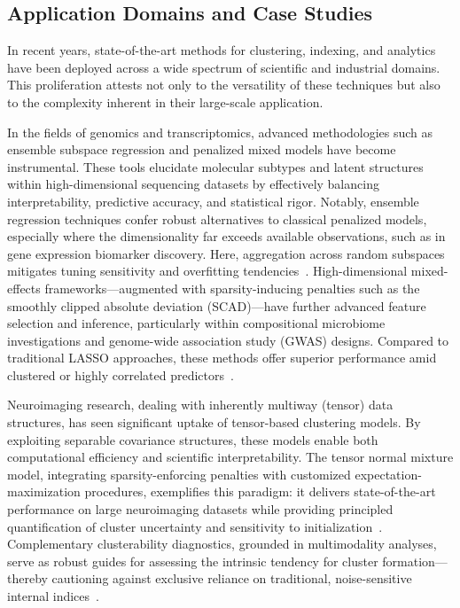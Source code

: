 \documentclass[sigconf]{acmart}
\begin{document}
\subsection{Application Domains and Case Studies}

In recent years, state-of-the-art methods for clustering, indexing, and analytics have been deployed across a wide spectrum of scientific and industrial domains. This proliferation attests not only to the versatility of these techniques but also to the complexity inherent in their large-scale application. 

In the fields of genomics and transcriptomics, advanced methodologies such as ensemble subspace regression and penalized mixed models have become instrumental. These tools elucidate molecular subtypes and latent structures within high-dimensional sequencing datasets by effectively balancing interpretability, predictive accuracy, and statistical rigor. Notably, ensemble regression techniques confer robust alternatives to classical penalized models, especially where the dimensionality far exceeds available observations, such as in gene expression biomarker discovery. Here, aggregation across random subspaces mitigates tuning sensitivity and overfitting tendencies~\cite{ref79,ref100}. High-dimensional mixed-effects frameworks—augmented with sparsity-inducing penalties such as the smoothly clipped absolute deviation (SCAD)—have further advanced feature selection and inference, particularly within compositional microbiome investigations and genome-wide association study (GWAS) designs. Compared to traditional LASSO approaches, these methods offer superior performance amid clustered or highly correlated predictors~\cite{ref82}.

Neuroimaging research, dealing with inherently multiway (tensor) data structures, has seen significant uptake of tensor-based clustering models. By exploiting separable covariance structures, these models enable both computational efficiency and scientific interpretability. The tensor normal mixture model, integrating sparsity-enforcing penalties with customized expectation-maximization procedures, exemplifies this paradigm: it delivers state-of-the-art performance on large neuroimaging datasets while providing principled quantification of cluster uncertainty and sensitivity to initialization~\cite{ref57}. Complementary clusterability diagnostics, grounded in multimodality analyses, serve as robust guides for assessing the intrinsic tendency for cluster formation—thereby cautioning against exclusive reliance on traditional, noise-sensitive internal indices~\cite{ref58}.
\end{document}
